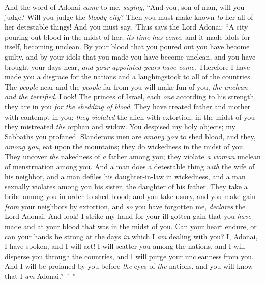 \begin{biblechapter} %
 And the word of Adonai \textit{came} to me, \textit{saying},
\verse “And you, son of man, will you judge? Will you judge the \textit{bloody city}? Then you must make known \textit{to} her all of her detestable things!
\verse And you must say, ‘Thus says the Lord Adonai: “A city pouring out blood in the midst of her; \textit{its time has come}, and it made idols for itself, becoming unclean.
\verse By your blood that you poured out you have become guilty, and by your idols that you made you have become unclean, and you have brought your days near, \textit{and your appointed years have come}. Therefore I have made you a disgrace for the nations and a laughingstock to all of the countries.
\verse The \textit{people} near and the \textit{people} far from you will make fun of you, \textit{the unclean and the terrified}.
\verse Look! The princes of Israel, each \textit{one} according to his strength, they are in you \textit{for the shedding of blood}.
\verse They have treated father and mother with contempt in you; \textit{they violated} the alien with extortion; in the midst of you they mistreated \textit{the} orphan and widow.
\verse You despised my holy objects; my Sabbaths you profaned.
\verse Slanderous men are \textit{among you} to shed blood, and they, \textit{among you}, eat upon the mountains; they do wickedness in the midst of you.
\verse They uncover \textit{the} nakedness of \textit{a} father among you; they violate \textit{a woman} unclean of menstruation among you.
\verse And a man does a detestable thing \textit{with} the wife of his neighbor, and a man defiles his daughter-in-law in wickedness, and a man sexually violates among you his sister, the daughter of his father.
\verse They take a bribe among you in order to shed blood; and you take usury, and you make gain \textit{from} your neighbors by extortion, and \textit{so} you have forgotten me, \textit{declares} the Lord Adonai.
\verse And look! I strike my hand for your ill-gotten gain that you \textit{have} made and at your blood that was in the midst of you.
\verse Can your heart endure, or can your hands be strong at the days \textit{in} which I \textit{am} dealing with you? I, Adonai, I have spoken, and I will act!
\verse I will scatter you among the nations, and I will disperse you through the countries, and I will purge your uncleanness from you.
\verse And I will be profaned by you before \textit{the} eyes of \textit{the} nations, and you will know that I \textit{am} Adonai.” ’ ”

\end{biblechapter}
